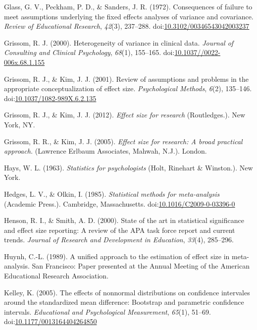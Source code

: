 \documentclass[
  man,floatsintext]{apa6}
\begin{document}
\leavevmode\hypertarget{ref-Glass_et_al_1972}{}%
Glass, G. V., Peckham, P. D., \& Sanders, J. R. (1972). Consequences of failure to meet assumptions underlying the fixed effects analyses of variance and covariance. \emph{Review of Educational Research}, \emph{42}(3), 237--288. doi:\href{https://doi.org/10.3102/00346543042003237}{10.3102/00346543042003237}

\leavevmode\hypertarget{ref-Grissom_2000}{}%
Grissom, R. J. (2000). Heterogeneity of variance in clinical data. \emph{Journal of Consulting and Clinical Psychology}, \emph{68}(1), 155--165. doi:\href{https://doi.org/10.1037//0022-006x.68.1.155}{10.1037//0022-006x.68.1.155}

\leavevmode\hypertarget{ref-Grissom_Kim_2001}{}%
Grissom, R. J., \& Kim, J. J. (2001). Review of assumptions and problems in the appropriate conceptualization of effect size. \emph{Psychological Methods}, \emph{6}(2), 135--146. doi:\href{https://doi.org/10.1037/1082-989X.6.2.135}{10.1037/1082-989X.6.2.135}

\leavevmode\hypertarget{ref-Grissom_and_Kim_2012}{}%
Grissom, R. J., \& Kim, J. J. (2012). \emph{Effect size for research} (Routledges.). New York, NY.

\leavevmode\hypertarget{ref-Grissom_and_kim_2005}{}%
Grissom, R. R., \& Kim, J. J. (2005). \emph{Effect size for research: A broad practical approach.} (Lawrence Erlbaum Associates, Mahwah, N.J.). London.

\leavevmode\hypertarget{ref-Hays_1963}{}%
Hays, W. L. (1963). \emph{Statistics for psychologists} (Holt, Rinehart \& Winston.). New York.

\leavevmode\hypertarget{ref-Hedges_Olkin_1985}{}%
Hedges, L. V., \& Olkin, I. (1985). \emph{Statistical methods for meta-analysis} (Academic Press.). Cambridge, Massachusetts. doi:\href{https://doi.org/10.1016/C2009-0-03396-0}{10.1016/C2009-0-03396-0}

\leavevmode\hypertarget{ref-Henson_Smith_2000}{}%
Henson, R. I., \& Smith, A. D. (2000). State of the art in statistical significance and effect size reporting: A review of the APA task force report and current trends. \emph{Journal of Research and Development in Education}, \emph{33}(4), 285--296.

\leavevmode\hypertarget{ref-Huynh_1989}{}%
Huynh, C.-L. (1989). A unified approach to the estimation of effect size in meta-analysis. San Francisco: Paper presented at the Annual Meeting of the American Educational Research Association.

\leavevmode\hypertarget{ref-Kelley_2005}{}%
Kelley, K. (2005). The effects of nonnormal distributions on confidence intervales around the standardized mean difference: Bootstrap and parametric confidence intervals. \emph{Educational and Psychological Measurement}, \emph{65}(1), 51--69. doi:\href{https://doi.org/10.1177/0013164404264850}{10.1177/0013164404264850}
\end{document}
